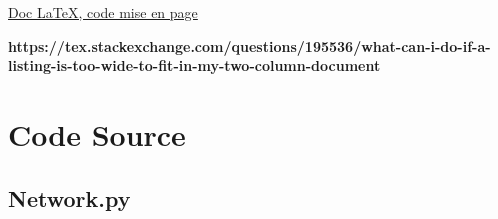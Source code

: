 \documentclass[a4paper]{article}
\begin{document}
\href{https://tex.stackexchange.com/questions/195536/what-can-i-do-if-a-listing-is-too-wide-to-fit-in-my-two-column-document
}{Doc \LaTeX , code mise en page}

\textbf{https://tex.stackexchange.com/questions/195536/what-can-i-do-if-a-listing-is-too-wide-to-fit-in-my-two-column-document\\}


\newpage
\section{Code Source}

\subsection{Network.py} \label{network.py}
\end{document}
